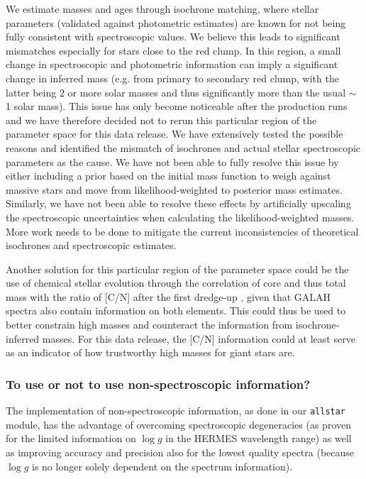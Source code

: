 \documentclass[
  journal=pasa,
  manuscript=research-paper, %
  year=2024,
  volume=37
]{cup-journal}
\newcommand{\logg}{$\log g$\xspace}
\begin{document}
We estimate masses and ages through isochrone matching, where stellar parameters (validated against photometric estimates) are known for not being fully consistent with spectroscopic values.
We believe this leads to significant mismatches especially for stars close to the red clump. In this region, a small change in spectroscopic and photometric information can imply a significant change in inferred mass (e.g. from primary to secondary red clump, with the latter being 2 or more solar masses and thus significantly more than the usual $\sim$ 1 solar mass). This issue has only become noticeable after the production runs and we have therefore decided not to rerun this particular region of the parameter space for this data release. We have extensively tested the possible reasons and identified the mismatch of isochrones and actual stellar spectroscopic parameters as the cause. We have not been able to fully resolve this issue by either including a prior based on the initial mass function to weigh against massive stars \citep[see e.g.][]{Sharma2018} and move from likelihood-weighted to posterior mass estimates. Similarly, we have not been able to resolve these effects by artificially upscaling the spectroscopic uncertainties when calculating the likelihood-weighted masses. More work needs to be done to mitigate the current inconsistencies of theoretical isochrones and spectroscopic estimates.

Another solution for this particular region of the parameter space could be the use of chemical stellar evolution through the correlation of core and thus total mass with the ratio of [C/N] after the first dredge-up \citep{Masseron2015, Martig2016}, given that GALAH spectra also contain information on both elements. This could thus be used to better constrain high masses and counteract the information from isochrone-inferred masses. For this data release, the [C/N] information could at least serve as an indicator of how trustworthy high masses for giant stars are.

\subsubsection{To use or not to use non-spectroscopic information?}

The implementation of non-spectroscopic information, as done in our \texttt{allstar} module, has the advantage of overcoming spectroscopic degeneracies (as proven for the limited information on \logg in the HERMES wavelength range) as well as improving accuracy and precision also for the lowest quality spectra (because \logg is no longer solely dependent on the spectrum information).
\end{document}
